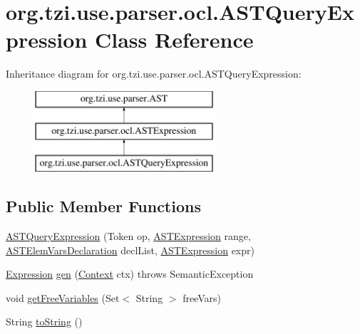 \hypertarget{classorg_1_1tzi_1_1use_1_1parser_1_1ocl_1_1_a_s_t_query_expression}{\section{org.\-tzi.\-use.\-parser.\-ocl.\-A\-S\-T\-Query\-Expression Class Reference}
\label{classorg_1_1tzi_1_1use_1_1parser_1_1ocl_1_1_a_s_t_query_expression}
}
Inheritance diagram for org.\-tzi.\-use.\-parser.\-ocl.\-A\-S\-T\-Query\-Expression\-:\begin{figure}[H]
\begin{center}
\leavevmode
\includegraphics[height=3.000000cm]{classorg_1_1tzi_1_1use_1_1parser_1_1ocl_1_1_a_s_t_query_expression}
\end{center}
\end{figure}
\subsection*{Public Member Functions}
\begin{DoxyCompactItemize}
\item 
\hyperlink{classorg_1_1tzi_1_1use_1_1parser_1_1ocl_1_1_a_s_t_query_expression_aedf2b3053833c44e4b6c844087911842}{A\-S\-T\-Query\-Expression} (Token op, \hyperlink{classorg_1_1tzi_1_1use_1_1parser_1_1ocl_1_1_a_s_t_expression}{A\-S\-T\-Expression} range, \hyperlink{classorg_1_1tzi_1_1use_1_1parser_1_1ocl_1_1_a_s_t_elem_vars_declaration}{A\-S\-T\-Elem\-Vars\-Declaration} decl\-List, \hyperlink{classorg_1_1tzi_1_1use_1_1parser_1_1ocl_1_1_a_s_t_expression}{A\-S\-T\-Expression} expr)
\item 
\hyperlink{classorg_1_1tzi_1_1use_1_1uml_1_1ocl_1_1expr_1_1_expression}{Expression} \hyperlink{classorg_1_1tzi_1_1use_1_1parser_1_1ocl_1_1_a_s_t_query_expression_a761fb9b980fee3fed11d4274e348577f}{gen} (\hyperlink{classorg_1_1tzi_1_1use_1_1parser_1_1_context}{Context} ctx)  throws Semantic\-Exception 
\item 
void \hyperlink{classorg_1_1tzi_1_1use_1_1parser_1_1ocl_1_1_a_s_t_query_expression_a9b89962f15a7f260fd5a5207091b0be4}{get\-Free\-Variables} (Set$<$ String $>$ free\-Vars)
\item 
String \hyperlink{classorg_1_1tzi_1_1use_1_1parser_1_1ocl_1_1_a_s_t_query_expression_a00e048e6afeca00edf44e14572fadb1c}{to\-String} ()
\end{DoxyCompactItemize}

